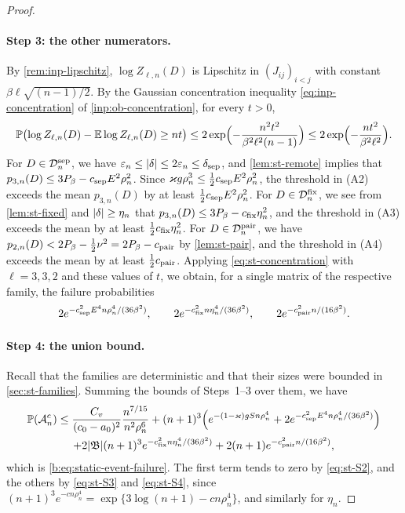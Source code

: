 \begin{proof}
\paragraph{Step 3: the other numerators.} By \cref{rem:inp-lipschitz}, $\log Z_{\ell,n}(D)$ is Lipschitz in $(J_{ij})_{i<j}$ with constant $\beta\ell\sqrt{(n-1)/2}$. By the Gaussian concentration inequality \eqref{eq:inp-concentration} of \cref{inp:ob-concentration}, for every $t>0$,
\begin{equation}\label{eq:st-concentration}
 \mathbb P\bigl(\log Z_{\ell,n}(D)-\mathbb E\log Z_{\ell,n}(D)\ge nt\bigr)\le2\exp\Bigl(-\frac{n^2t^2}{\beta^2\ell^2(n-1)}\Bigr)\le2\exp\Bigl(-\frac{nt^2}{\beta^2\ell^2}\Bigr).
\end{equation}
For $D\in\mathcal D^{\rm sep}_n$, we have $\varepsilon_n\le\lvert \delta\rvert\le2\varepsilon_n\le\delta_{\rm sep}$, and \cref{lem:st-remote} implies that $p_{3,n}(D)\le3P_\beta-c_{\rm sep}E^2\rho_n^2$. Since $\varkappa g\rho_n^3\le\frac12c_{\rm sep}E^2\rho_n^2$, the threshold in (A2) exceeds the mean $p_{3,n}(D)$ by at least $\frac12c_{\rm sep}E^2\rho_n^2$. For $D\in\mathcal D^{\rm fix}_n$, we see from \cref{lem:st-fixed} and $\lvert \delta\rvert\ge\eta_n$ that $p_{3,n}(D)\le3P_\beta-c_{\rm fix}\eta_n^2$, and the threshold in (A3) exceeds the mean by at least $\frac12c_{\rm fix}\eta_n^2$. For $D\in\mathcal D^{\rm pair}_n$, we have $p_{2,n}(D)<2P_\beta-\frac12\nu^2=2P_\beta-c_{\rm pair}$ by \cref{lem:st-pair}, and the threshold in (A4) exceeds the mean by at least $\frac12c_{\rm pair}$. Applying \eqref{eq:st-concentration} with $\ell=3,3,2$ and these values of $t$, we obtain, for a single matrix of the respective family, the failure probabilities
\[
 2e^{-c_{\rm sep}^2E^4n\rho_n^4/(36\beta^2)},\qquad
 2e^{-c_{\rm fix}^2n\eta_n^4/(36\beta^2)},\qquad
 2e^{-c_{\rm pair}^2n/(16\beta^2)}.
\]

\paragraph{Step 4: the union bound.} Recall that the families are deterministic and that their sizes were bounded in \cref{sec:st-families}. Summing the bounds of Steps~1--3 over them, we have
\begin{multline*}
 \mathbb P(\mathcal A_n^c)\le\frac{C_v}{(c_0-a_0)^2}\frac{n^{7/15}}{n^2\rho_n^6}
 +(n+1)^3\Bigl(e^{-(1-\varkappa)gS n\rho_n^4}+2e^{-c_{\rm sep}^2E^4n\rho_n^4/(36\beta^2)}\Bigr)\\
 +2\lvert \mathfrak B\rvert(n+1)^3e^{-c_{\rm fix}^2n\eta_n^4/(36\beta^2)}+2(n+1)e^{-c_{\rm pair}^2n/(16\beta^2)},
\end{multline*}
which is \eqref{b:eq:static-event-failure}. The first term tends to zero by \eqref{eq:st-S2}, and the others by \eqref{eq:st-S3} and \eqref{eq:st-S4}, since $(n+1)^3e^{-cn\rho_n^4}=\exp\{3\log(n+1)-cn\rho_n^4\}$, and similarly for $\eta_n$.


\end{proof}

